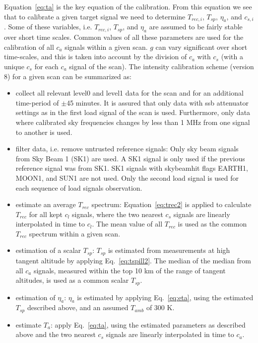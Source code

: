 Equation~\ref{eq:ta} is the key equation of the calibration.
From this equation we see that to calibrate a given target signal
we need to determine \(T_{rec,i}\), \(T_{sp}\), \(\eta_{a}\),
and \(c_{s,i}\). Some of these variables, i.e. \(T_{rec,i}\), \(T_{sp}\), and \(\eta_{a}\)
are assumed to be fairly stable over short time scales.
Common values of all these parameters are used for
the calibration of all \(c_{a}\) signals within a given scan.
\(g\) can vary significant over short time-scales,
and this is taken into account by the division of \(c_{a}\) with
\(c_{s}\) (with a unique \(c_{s}\) for each \(c_{a}\)
signal of the scan). The intensity calibration scheme (version 8)
for a given scan can be summarized as:
\begin{itemize}
\item collect all relevant level0 and level1 data for the scan and for an
additional time-period of \(\pm\)45 minutes.
It is assured that only data with ssb attenuator settings
as in the first load signal of the scan is used.
Furthermore, only data where calibrated sky frequencies changes by less
than 1 MHz from one signal to another is used.

\item filter data, i.e. remove untrusted reference signals:\newline
Only sky beam signals from Sky Beam 1 (SK1) are used.
A SK1 signal is only used if the previous
reference signal was from SK1.
SK1 signals with skybeamhit flags EARTH1, MOON1, and SUN1 are not used.
Only the second load signal is used for each sequence of load signals
observation.

\item estimate an average \(T_{rec}\) spectrum:\newline
Equation~\ref{eq:trec2} is applied to calculate \(T_{rec}\)
for all kept \(c_{l}\) signals, where
the two nearest \(c_{s}\) signals are linearly interpolated
in time to \(c_{l}\).
The mean value of all \(T_{rec}\) is used as the
common \(T_{rec}\) spectrum within a given scan.
\item estimation of a scalar \(T_{sp}\):\newline
\(T_{sp}\) is estimated from measurements at high tangent altitude
by applying Eq.~\ref{eq:tspill2}.
The median of the median
from all \(c_{a}\) signals, measured within the top 10 km
of the range of tangent altitudes, is used as a common scalar \(T_{sp}\).
\item estimation of \(\eta_{a}\):\newline
\(\eta_{a}\) is estimated by applying Eq.~\ref{eq:eta},
using the estimated \(T_{sp}\) described above, and an
assumed \(T_{amb}\) of 300 K.
\item estimate \(T_{a}\): \newline
apply Eq.~\ref{eq:ta}, using the estimated parameters as described
above and
the two nearest \(c_{s}\) signals are linearly interpolated
in time to \(c_{a}\).
\end{itemize}



